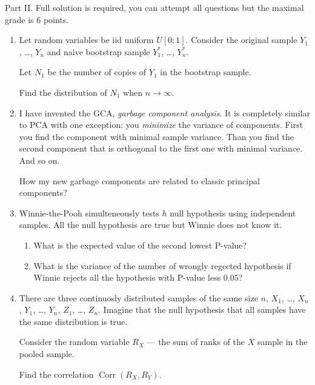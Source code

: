 \documentclass[12pt]{article}
\DeclareMathOperator{\Corr}{Corr}
\begin{document}
	Part II. Full solution is required, you can attempt all questions but the maximal grade is 6 points. 
	\begin{enumerate}[resume]
			\item Let random variables  be iid uniform $U[0;1]$.
			Consider the original sample $Y_1$, \ldots, $Y_n$ and naive bootstrap sample $Y_1^*$, \ldots, $Y_n^*$.
			
			Let $N_1$ be the number of copies of $Y_1$ in the bootstrap sample. 

			Find the distribution of $N_1$ when $n\to \infty$. 

			\item I have invented the GCA, \textit{garbage component analysis}. 
			It is completely similar to PCA with one exception: you \textit{minimize} the variance of components. 
			First you find the component with minimal sample variance. Than you find the second component that is 
			orthogonal to the first one with minimal variance. And so on. 

			How my new garbage components are related to classic principal components?


			\item Winnie-the-Pooh simulteneously tests $h$ null hypothesis using independent samples. 
			All the null hypothesis are true but Winnie does not know it. 
			
			\begin{enumerate}
				\item What is the expected value of the second lowest P-value?
				\item What is the variance of the number of wrongly regected hypothesis if Winnie rejects all the hypothesis with P-value less $0.05$?
			\end{enumerate}
		
		\item There are three continuosly distributed samples of the same size $n$, $X_1$, \ldots, $X_n$, $Y_1$, \ldots, $Y_n$,
		$Z_1$, \ldots, $Z_n$. Imagine that the null hypothesis that all samples have the same distribution is true. 
		
		Consider the random variable $R_X$ — the sum of ranks of the $X$ sample in the pooled sample. 
		
		Find the correlation $\Corr(R_X, R_Y)$.
		\end{enumerate}
		
	
\end{document}
